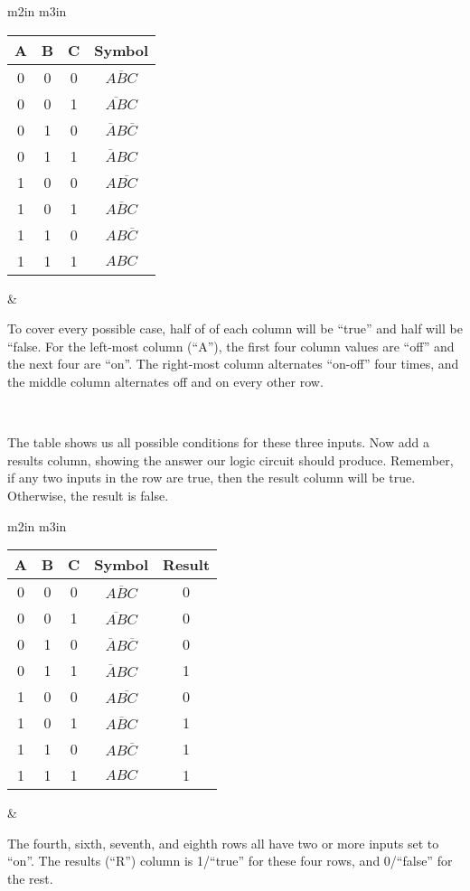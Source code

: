 \begin{tabular}{m{2in} m{3in}}

\begin{tabular}{cccc}
\hline
A & B & C & Symbol\\
\hline
0 & 0 & 0 & $\overline{ABC}$\\
0 & 0 & 1 & $\overline{AB}C$\\
0 & 1 & 0 & $\overline{A}B\overline{C}$\\
0 & 1 & 1 & $\overline{A}BC$\\
1 & 0 & 0 & $A\overline{BC}$\\
1 & 0 & 1 & $A\overline{B}C$\\
1 & 1 & 0 & $AB\overline{C}$\\
1 & 1 & 1 & $ABC$\\
\hline
\end{tabular}

&

To cover every possible case, half of of each column will be ``true'' and half will be ``false. For the left-most column (``A''), the first four column values are ``off'' and the next four are ``on''. The right-most column alternates ``on-off'' four times, and the middle column alternates off and on every other row. 


\\
\end{tabular}

\renewcommand{\arraystretch}{1.0}


The table shows us all possible conditions for these three inputs. Now add a results column, showing the answer our logic circuit should produce. Remember, if any two inputs in the row are true, then the result column will be true. Otherwise, the result is false.

\begin{tabular}{m{2in} m{3in}}
\renewcommand{\arraystretch}{1.2}
\begin{tabular}{ccccc}
\hline
A & B & C & Symbol & Result\\
\hline
0 & 0 & 0 & $\overline{ABC}$ & 0\\
0 & 0 & 1 & $\overline{AB}C$ & 0\\
0 & 1 & 0 & $\overline{A}B\overline{C}$ & 0\\
0 & 1 & 1 & $\overline{A}BC$ & 1\\
1 & 0 & 0 & $A\overline{BC}$ & 0\\
1 & 0 & 1 & $A\overline{B}C$ & 1\\
1 & 1 & 0 & $AB\overline{C}$ & 1\\
1 & 1 & 1 & $ABC$ & 1\\
\hline
\end{tabular}

&

The fourth, sixth, seventh, and eighth rows all have two or more inputs set to ``on''. The results (``R'') column is 1/``true'' for these four rows, and 0/``false'' for the rest. 

\\
\end{tabular}
\renewcommand{\arraystretch}{1.0}

